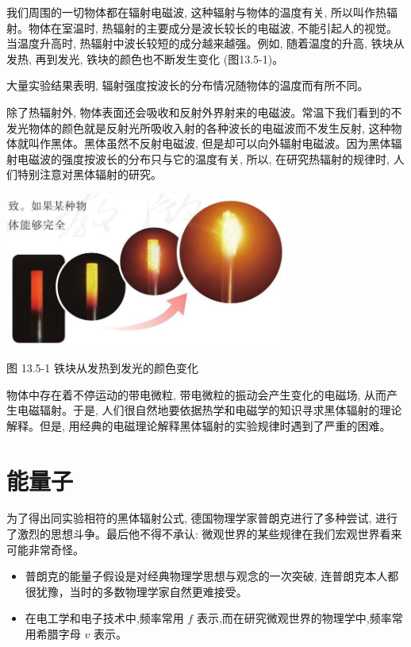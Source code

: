\documentclass[10pt]{article}
\begin{document}
我们周围的一切物体都在辐射电磁波, 这种辐射与物体的温度有关, 所以叫作热辐射。物体在室温时, 热辐射的主要成分是波长较长的电磁波, 不能引起人的视觉。当温度升高时, 热辐射中波长较短的成分越来越强。例如, 随着温度的升高, 铁块从发热, 再到发光, 铁块的颜色也不断发生变化 (图13.5-1)。

大量实验结果表明, 辐射强度按波长的分布情况随物体的温度而有所不同。

除了热辐射外, 物体表面还会吸收和反射外界射来的电磁波。常温下我们看到的不发光物体的颜色就是反射光所吸收入射的各种波长的电磁波而不发生反射, 这种物体就叫作黑体。黑体虽然不反射电磁波, 但是却可以向外辐射电磁波。因为黑体辐射电磁波的强度按波长的分布只与它的温度有关, 所以, 在研究热辐射的规律时, 人们特别注意对黑体辐射的研究。

\begin{center}
\includegraphics[max width=0.7\textwidth]{images/01911d5f-8e38-70c0-b5b8-2b399bd115b6_129_873840.jpg}
\end{center}

图 13.5-1 铁块从发热到发光的颜色变化

物体中存在着不停运动的带电微粒, 带电微粒的振动会产生变化的电磁场, 从而产生电磁辐射。于是, 人们很自然地要依据热学和电磁学的知识寻求黑体辐射的理论解释。但是, 用经典的电磁理论解释黑体辐射的实验规律时遇到了严重的困难。

\section*{能量子}

为了得出同实验相符的黑体辐射公式, 德国物理学家普朗克进行了多种尝试, 进行了激烈的思想斗争。最后他不得不承认: 微观世界的某些规律在我们宏观世界看来可能非常奇怪。

\begin{mdframed}

\begin{itemize}
\item 普朗克的能量子假设是对经典物理学思想与观念的一次突破, 连普朗克本人都很犹豫，当时的多数物理学家自然更难接受。
\end{itemize}

\begin{itemize}
\item 在电工学和电子技术中,频率常用 \(f\) 表示,而在研究微观世界的物理学中,频率常用希腊字母 \(v\) 表示。
\end{itemize}

\end{mdframed}
\end{document}
